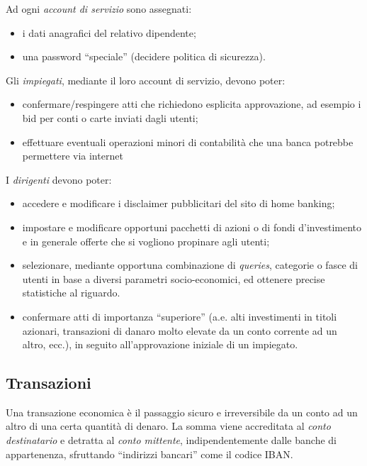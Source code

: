Ad ogni \emph{account di servizio} sono assegnati:
\begin{itemize}
	\item i dati anagrafici del relativo dipendente;
	\item una password ``speciale'' (decidere politica di sicurezza).
\end{itemize}	

Gli \emph{impiegati}, mediante il loro account di servizio, devono poter: 
\begin{itemize}
	\item confermare/respingere atti che richiedono esplicita approvazione, ad esempio i bid per conti o carte inviati dagli utenti; 
	\item effettuare eventuali operazioni minori di contabilità che una banca potrebbe permettere via internet
\end{itemize}

I \emph{dirigenti} devono poter:
\begin{itemize}
	\item accedere e modificare i disclaimer pubblicitari del sito di home banking;
	\item impostare e modificare opportuni pacchetti di azioni o di fondi d'investimento e in generale offerte che si vogliono propinare agli utenti;
	\item selezionare, mediante opportuna combinazione di \emph{queries}, categorie o fasce di utenti in base a diversi parametri socio-economici, ed ottenere precise statistiche al riguardo.
	\item confermare atti di importanza ``superiore'' (a.e. alti investimenti in titoli azionari, transazioni di danaro molto elevate da un conto corrente ad un altro, ecc.), in seguito all'approvazione iniziale di un impiegato.
\end{itemize}

\subsection{Transazioni}

Una transazione economica è il passaggio sicuro e irreversibile da un conto ad un altro di una certa quantità di denaro.
La somma viene accreditata al \emph{conto destinatario} e detratta al \emph{conto mittente}, indipendentemente dalle banche di appartenenza, sfruttando ``indirizzi bancari'' come il codice IBAN.



